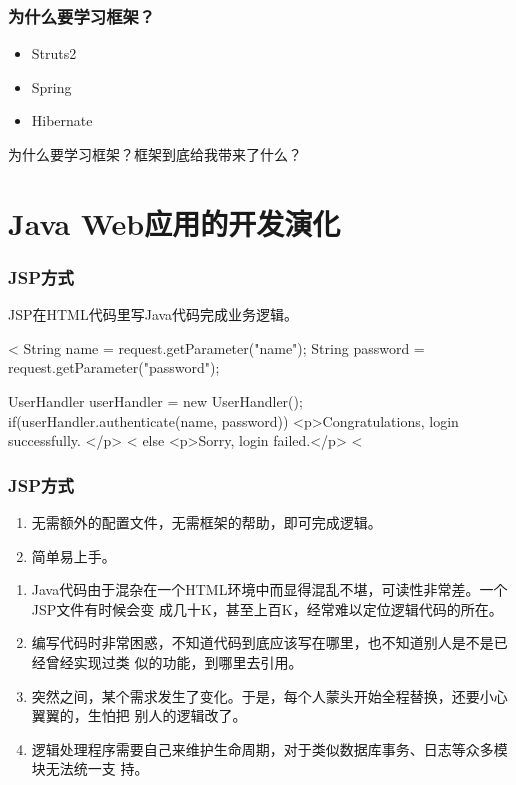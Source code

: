 \begin{frame}[fragile] %
\frametitle{为什么要学习框架？}
\begin{itemize}
\item Struts2
\item Spring
\item Hibernate
\end{itemize}

{\Blue 为什么要学习框架？框架到底给我带来了什么？}
\end{frame}

\section{Java Web应用的开发演化}

\begin{frame}[fragile] %
\frametitle{JSP方式}

JSP在HTML代码里写Java代码完成业务逻辑。

\begin{xmlCode}
<%
     String name = request.getParameter("name");
     String password = request.getParameter("password");

     UserHandler userHandler = new UserHandler();
     if(userHandler.authenticate(name, password)) {
<p>Congratulations, login successfully. </p>
<%
      } else {
<p>Sorry, login failed.</p>
<%
      }
\end{xmlCode}
\end{frame}

\begin{frame}[fragile] %
\frametitle{JSP方式}

\kai
\begin{enumerate}
\item 无需额外的配置文件，无需框架的帮助，即可完成逻辑。
\item 简单易上手。
\end{enumerate}

\begin{enumerate}[<+-| alert@+>]\kai
\item Java代码由于混杂在一个HTML环境中而显得混乱不堪，可读性非常差。一个JSP文件有时候会变
  成几十K，甚至上百K，经常难以定位逻辑代码的所在。
\item 编写代码时非常困惑，不知道代码到底应该写在哪里，也不知道别人是不是已经曾经实现过类
  似的功能，到哪里去引用。
\item 突然之间，某个需求发生了变化。于是，每个人蒙头开始全程替换，还要小心翼翼的，生怕把
  别人的逻辑改了。
\item 逻辑处理程序需要自己来维护生命周期，对于类似数据库事务、日志等众多模块无法统一支
  持。
\end{enumerate}
\end{frame}

